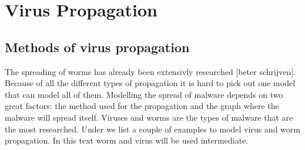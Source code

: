 \chapter{Virus Propagation }
\label{chapter4: Virus propagation}
%
%
%
%
%
%
%
\section{Methods of virus propagation}

The spreading of worms has already been extensivly researched [beter schrijven]. Because of all the different types of propagation it is hard to pick out one model that can model all of them. Modelling the spread of malware depends on two great factors: the method used for the propagation and the graph where the malware will spread itself. Viruses and worms are the types of malware that are the most researched. Under we list a couple of examples to model virus and worm propagation. In this text worm and virus will be used intermediate. 

